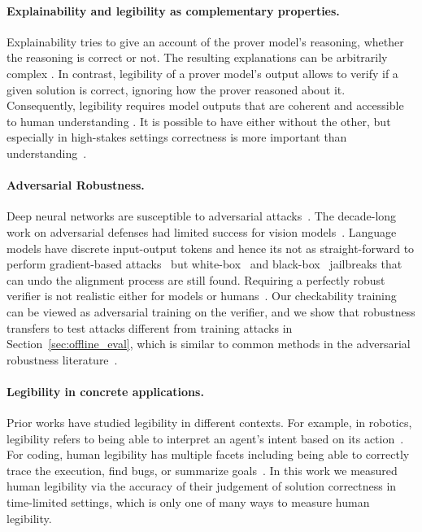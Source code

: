 \documentclass{article}
\begin{document}
\paragraph{Explainability and legibility as complementary properties.} Explainability \citep{zhao2024explainability} tries to give an account of the prover model's reasoning, whether the reasoning is correct or not. The resulting explanations can be arbitrarily complex \citep{nanda2023progress}. In contrast, legibility of a prover model's output allows to verify if a given solution is correct, ignoring how the prover reasoned about it. Consequently, legibility requires model outputs that are coherent and accessible to human understanding \citep{rudin2019stop}. It is possible to have either without the other, but especially in high-stakes settings correctness is more important than understanding~\citep{ziegler2022adversarial}.

\paragraph{Adversarial Robustness.}
Deep neural networks are susceptible to adversarial attacks~\citep{szegedy2013intriguing, biggio2013evasion}. The decade-long work on adversarial defenses had limited success for vision models~\citep{croce2020robustbench}. Language models have discrete input-output tokens and hence its not as straight-forward to perform gradient-based attacks~\citep{carlini2024aligned} but white-box~\citep{zou2023universal} and black-box~\citep{shah2023scalable, hayase2024query} jailbreaks that can undo the alignment process are still found. Requiring a perfectly robust verifier is not realistic either for models or humans~\citep{elsayed2018adversarial}. Our checkability training can be viewed as adversarial training on the verifier, and we show that robustness transfers to test attacks different from training attacks in Section~\ref{sec:offline_eval}, which is similar to common methods in the adversarial robustness literature~\citep{carlini2019evaluating}.



\paragraph{Legibility in concrete applications.} Prior works have studied legibility in different contexts. For example, in robotics, legibility refers to being able to interpret an agent's intent based on its action~\citep{dragan2013legibility}. For coding, human legibility has multiple facets including being able to correctly trace the execution, find bugs, or summarize goals~\citep{oliveira2020evaluating, wen2024learning}. In this work we measured human legibility via the accuracy of their judgement of solution correctness in time-limited settings, which is only one of many ways to measure human legibility.
\end{document}
